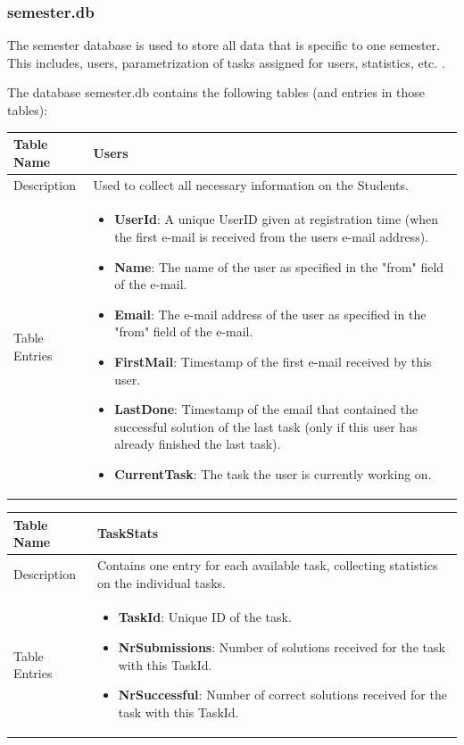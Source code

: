 \newpage

\subsubsection{semester.db}

The semester database is used to store all data that is specific to one semester. This includes,
users, parametrization of tasks assigned for users, statistics, etc. .

The database semester.db contains the following tables (and entries in those tables):

\begin{tabular}{|p{3cm}|p{10cm}|}
\hline
Table Name & Users \\
\hline
Description & Used to collect all necessary information on the Students.\\
\hline
Table Entries & \begin{itemize}
        \item {\bf UserId}: A unique UserID given at registration time (when the first e-mail
            is received from the users e-mail address).
        \item {\bf Name}: The name of the user as specified in the "from" field of the e-mail.
        \item {\bf Email}: The e-mail address of the user as specified in the "from" field of the
            e-mail.
        \item {\bf FirstMail}: Timestamp of the first e-mail received by this user.
        \item {\bf LastDone}: Timestamp of the email that contained the successful solution of the
            last task (only if this user has already finished the last task).
        \item {\bf CurrentTask}: The task the user is currently working on.
        \end{itemize} \\
\hline
\end{tabular}

\begin{tabular}{|p{3cm}|p{10cm}|}
\hline
Table Name & TaskStats \\
\hline
Description & Contains one entry for each available task, collecting statistics on the individual tasks.\\
\hline
Table Entries & \begin{itemize}
        \item {\bf TaskId}: Unique ID of the task.
        \item {\bf NrSubmissions}: Number of solutions received for the task with this TaskId.
        \item {\bf NrSuccessful}: Number of correct solutions received for the task with this TaskId.
        \end{itemize} \\
\hline
\end{tabular}

